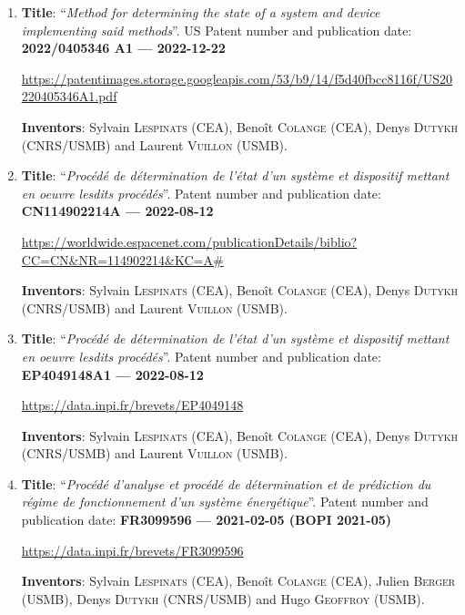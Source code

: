 \documentclass[final, a4paper, oneside, 12pt]{article}
\numberwithin{equation}{section}
\begin{document}
\begin{enumerate}

  \item \textbf{Title}: ``\textit{Method for determining the state of a system and device implementing said methods}''. US Patent number and publication date: \textbf{2022/0405346 A1 --- 2022-12-22}

  {\footnotesize \url{https://patentimages.storage.googleapis.com/53/b9/14/f5d40fbcc8116f/US20220405346A1.pdf}}

  \textbf{Inventors}: Sylvain \textsc{Lespinats} (CEA), Beno\^it \textsc{Colange} (CEA), Denys \textsc{Dutykh} (CNRS/USMB) and Laurent \textsc{Vuillon} (USMB).

  
  \item \textbf{Title}: ``\textit{Proc\'ed\'e de d\'etermination de l'\'etat d'un syst\`eme et dispositif mettant en oeuvre lesdits proc\'ed\'es}''. Patent number and publication date: \textbf{CN114902214A --- 2022-08-12}
  
  {\small \url{https://worldwide.espacenet.com/publicationDetails/biblio?CC=CN&NR=114902214&KC=A#}}
  
  \textbf{Inventors}: Sylvain \textsc{Lespinats} (CEA), Beno\^it \textsc{Colange} (CEA), Denys \textsc{Dutykh} (CNRS/USMB) and Laurent \textsc{Vuillon} (USMB).
  
  
  \item \textbf{Title}: ``\textit{Proc\'ed\'e de d\'etermination de l'\'etat d'un syst\`eme et dispositif mettant en oeuvre lesdits proc\'ed\'es}''. Patent number and publication date: \textbf{EP4049148A1 --- 2022-08-12}
  
  \url{https://data.inpi.fr/brevets/EP4049148}
  
  \textbf{Inventors}: Sylvain \textsc{Lespinats} (CEA), Beno\^it \textsc{Colange} (CEA), Denys \textsc{Dutykh} (CNRS/USMB) and Laurent \textsc{Vuillon} (USMB).
  

  \item \textbf{Title}: ``\textit{Proc\'ed\'e d'analyse et proc\'ed\'e de d\'etermination et de pr\'ediction du r\'egime de fonctionnement d'un syst\`eme \'energ\'etique}''. Patent number and publication date: \textbf{FR3099596 --- 2021-02-05 (BOPI 2021-05)}
  
  \url{https://data.inpi.fr/brevets/FR3099596}
  
  \textbf{Inventors}: Sylvain \textsc{Lespinats} (CEA), Beno\^it \textsc{Colange} (CEA), Julien \textsc{Berger} (USMB), Denys \textsc{Dutykh} (CNRS/USMB) and Hugo \textsc{Geoffroy} (USMB).
  

\end{enumerate}
\end{document}
